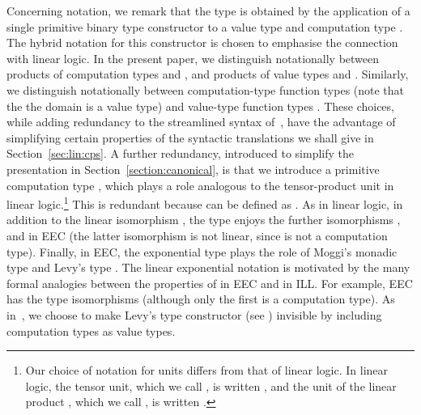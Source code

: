 \documentclass{LMCS}
\begin{document}
Concerning notation, 
we remark that the type  is obtained by the application
of a single primitive binary type constructor  to a value type  and 
computation type . The hybrid notation for this constructor is chosen to emphasise the connection
with linear logic. 
In the present paper, we distinguish notationally
between products of computation types  and , and products of value
types  and . Similarly, we distinguish notationally between
computation-type function types  
(note that the the domain is a value type) and value-type function types
. These choices, while adding redundancy to the streamlined syntax of~\cite{EMS,EMSb},
have the advantage of  simplifying certain properties of the syntactic 
translations we shall give in Section~\ref{sec:lin:cps}.
A further redundancy, introduced to simplify the presentation in Section~\ref{section:canonical},
is that we introduce a primitive computation type , which plays a role analogous
to the tensor-product unit in linear logic.\footnote{Our choice of notation for units differs from
that of linear logic. In linear logic, the tensor unit, which we call ,  is written ,
and the  unit of the linear product , which we call , is written .}
This is redundant because  can be defined as .
As in linear logic, in addition to the linear isomorphism 
, the type  enjoys the further
isomorphisms , and
 in EEC
(the latter isomorphism is not linear, since  is not a computation
type).
Finally, 
in EEC, the exponential type  plays the role of 
Moggi's monadic type  and Levy's type . The linear exponential
notation is motivated by the many formal analogies between the properties of 
in EEC and in ILL. For example, EEC has the type isomorphisms
 (although only
the first is a computation type).
As in~\cite{EMS,EMSb},
we choose to make  
Levy's  type constructor (see \cite{Levy:book}) invisible by including
computation types as value types. 
\end{document}
